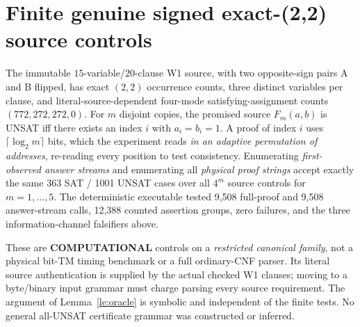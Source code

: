 \documentclass[11pt]{article}
\begin{document}
\section{Finite genuine signed exact-(2,2) source controls}
The immutable $15$-variable/$20$-clause W1 source,
with two opposite-sign pairs A and B flipped,
has exact $(2,2)$ occurrence counts, three distinct
variables per clause, and literal-source-dependent
four-mode satisfying-assignment counts
$(772,272,272,0)$.
For $m$ disjoint copies, the promised source
$F_m(a,b)$ is UNSAT iff there exists an index
$i$ with $a_i=b_i=1$.
A proof of index $i$ uses
$\lceil\log_2m\rceil$ bits, which the experiment
reads \emph{in an adaptive permutation of addresses},
re-reading every position to test consistency.
Enumerating \emph{first-observed answer streams}
and enumerating all \emph{physical proof strings}
accept exactly the same 363 SAT / 1001 UNSAT cases
over all $4^m$ source controls for $m=1,\ldots,5$.
The deterministic executable tested
9,508 full-proof and 9,508 answer-stream calls,
12,388 counted assertion groups, zero failures,
and the three information-channel falsifiers above.

These are \textbf{COMPUTATIONAL} controls on a
\emph{restricted canonical family}, not a physical
bit-TM timing benchmark or a full ordinary-CNF
parser. Its literal source authentication is
supplied by the actual checked W1 clauses;
moving to a byte/binary input grammar must
charge parsing every source requirement.
The argument of Lemma~\ref{le:oracle}
is symbolic and independent of the finite tests.
No general all-UNSAT certificate grammar was
constructed or inferred.
\end{document}
